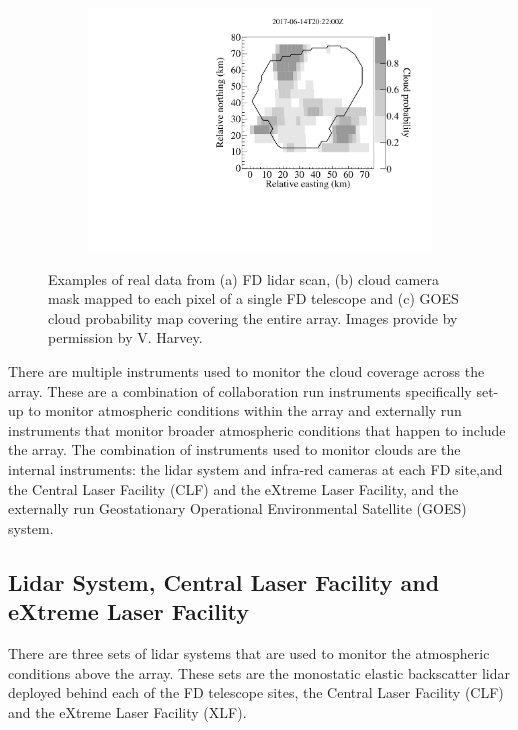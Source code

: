 \begin{figure}[!t]
\begin{subfigure}[b]{0.3\textwidth}
\caption{} \label{subfig:IR_cloudcam}
\end{subfigure}
\begin{subfigure}[b]{0.3\textwidth}
\includegraphics[width=\textwidth]{chapters/graphs/CloudFlags/ir_cloudprobability_map.pdf}
\caption{} \label{subfig:GOES}
\end{subfigure}
\caption{Examples of real data from (a) FD lidar scan, (b) cloud camera mask mapped to each pixel of a single FD telescope and (c) GOES cloud probability map covering the entire array.  Images provide by permission by V. Harvey.}
\end{figure}

There are multiple instruments used to monitor the cloud coverage across the array. These are a combination of collaboration run instruments specifically set-up to monitor atmospheric conditions within the array and externally run instruments that monitor broader atmospheric conditions that happen to include the array. The combination of instruments used to monitor clouds are the internal instruments: the lidar system and infra-red cameras at each FD site,and the Central Laser Facility (CLF) and the eXtreme Laser Facility, and the externally run Geostationary Operational Environmental Satellite (GOES) system.

 
\subsection{Lidar System, Central Laser Facility and eXtreme Laser Facility}

There are three sets of lidar systems that are used to monitor the atmospheric conditions above the array. These sets are the monostatic elastic backscatter lidar deployed behind each of the FD telescope sites, the Central Laser Facility (CLF) and the eXtreme Laser Facility (XLF).

